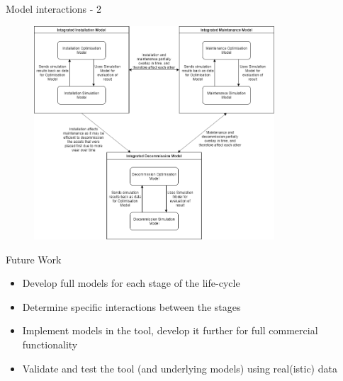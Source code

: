 \documentclass{beamer}
\begin{document}
\begin{frame}{Model interactions - 2}
\begin{figure}[t]
  \includegraphics[width=0.8\textwidth]{flowchart}
\centering
\end{figure}
\end{frame}


\begin{frame}{Future Work}
   \begin{itemize}
  	\item Develop full models for each stage of the life-cycle
  	\item Determine specific interactions between the stages
  	\item Implement models in the tool, develop it further for full commercial functionality
  	\item Validate and test the tool (and underlying models) using real(istic) data
  \end{itemize}
\end{frame}
\end{document}
